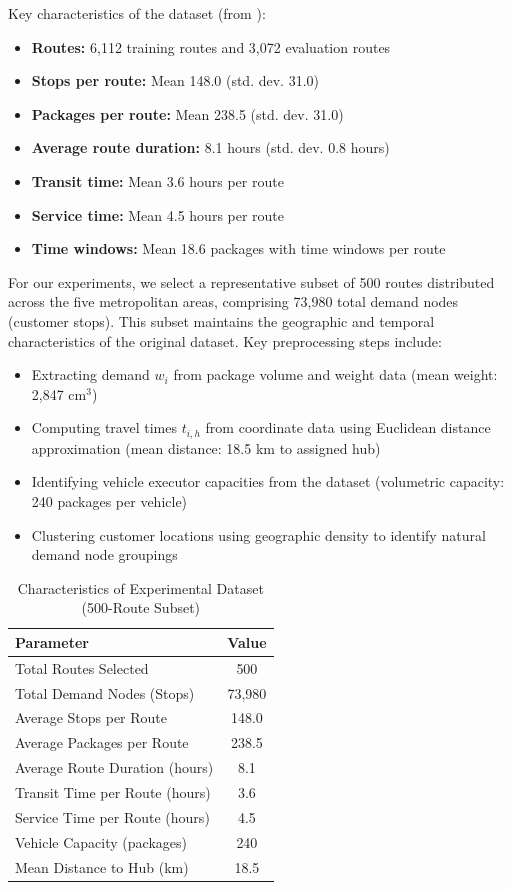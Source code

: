 \documentclass[conference]{IEEEtran}
\begin{document}
Key characteristics of the dataset (from \cite{b8}):

\begin{itemize}
\item \textbf{Routes:} 6,112 training routes and 3,072 evaluation routes
\item \textbf{Stops per route:} Mean 148.0 (std. dev. 31.0)
\item \textbf{Packages per route:} Mean 238.5 (std. dev. 31.0)
\item \textbf{Average route duration:} 8.1 hours (std. dev. 0.8 hours)
\item \textbf{Transit time:} Mean 3.6 hours per route
\item \textbf{Service time:} Mean 4.5 hours per route
\item \textbf{Time windows:} Mean 18.6 packages with time windows per route
\end{itemize}

For our experiments, we select a representative subset of 500 routes distributed across the five metropolitan areas, comprising 73,980 total demand nodes (customer stops). This subset maintains the geographic and temporal characteristics of the original dataset. Key preprocessing steps include:

\begin{itemize}
\item Extracting demand $w_i$ from package volume and weight data (mean weight: 2,847 cm$^3$)
\item Computing travel times $t_{i,h}$ from coordinate data using Euclidean distance approximation (mean distance: 18.5 km to assigned hub)
\item Identifying vehicle executor capacities from the dataset (volumetric capacity: 240 packages per vehicle)
\item Clustering customer locations using geographic density to identify natural demand node groupings
\end{itemize}

\begin{table}[htbp]
\caption{Characteristics of Experimental Dataset (500-Route Subset)}
\label{tab:dataset}
\centering
\renewcommand{\arraystretch}{1.2}
\begin{tabular}{|l|c|}
\hline
\textbf{Parameter} & \textbf{Value} \\
\hline
Total Routes Selected & 500 \\
\hline
Total Demand Nodes (Stops) & 73,980 \\
\hline
Average Stops per Route & 148.0 \\
\hline
Average Packages per Route & 238.5 \\
\hline
Average Route Duration (hours) & 8.1 \\
\hline
Transit Time per Route (hours) & 3.6 \\
\hline
Service Time per Route (hours) & 4.5 \\
\hline
Vehicle Capacity (packages) & 240 \\
\hline
Mean Distance to Hub (km) & 18.5 \\
\hline
\end{tabular}
\end{table}
\end{document}
